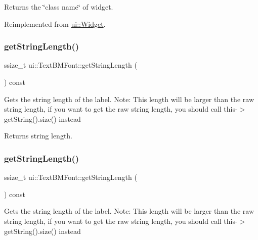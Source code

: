 Returns the \char`\"{}class name\char`\"{} of widget. 

Reimplemented from \hyperlink{classui_1_1Widget_ad85abdaa9133dc6b8efc32670ae9b93f}{ui\+::\+Widget}.

\mbox{\label{classui_1_1TextBMFont_adcae15f2ec3e20f18834b3e5afb3de37}} 
\subsubsection{\texorpdfstring{get\+String\+Length()}{getStringLength()}\hspace{0.1cm}{\footnotesize\ttfamily [1/2]}}
{\footnotesize\ttfamily ssize\+\_\+t ui\+::\+Text\+B\+M\+Font\+::get\+String\+Length (\begin{DoxyParamCaption}{ }\end{DoxyParamCaption}) const}

Gets the string length of the label. Note\+: This length will be larger than the raw string length, if you want to get the raw string length, you should call this-\/$>$get\+String().size() instead

\begin{DoxyReturn}{Returns}
string length. 
\end{DoxyReturn}
\mbox{\label{classui_1_1TextBMFont_adcae15f2ec3e20f18834b3e5afb3de37}} 
\subsubsection{\texorpdfstring{get\+String\+Length()}{getStringLength()}\hspace{0.1cm}{\footnotesize\ttfamily [2/2]}}
{\footnotesize\ttfamily ssize\+\_\+t ui\+::\+Text\+B\+M\+Font\+::get\+String\+Length (\begin{DoxyParamCaption}{ }\end{DoxyParamCaption}) const}

Gets the string length of the label. Note\+: This length will be larger than the raw string length, if you want to get the raw string length, you should call this-\/$>$get\+String().size() instead

